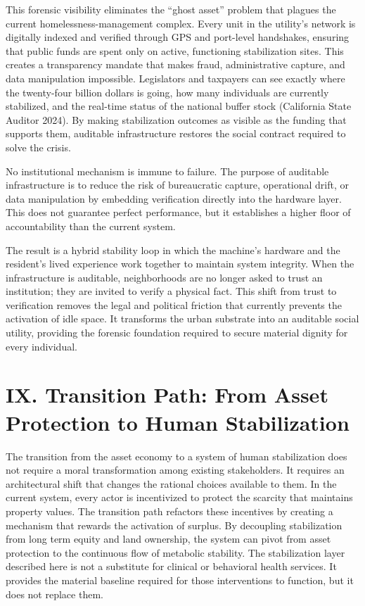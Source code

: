 \documentclass[
  12pt,
]{article}
\begin{document}
This forensic visibility eliminates the ``ghost asset'' problem that plagues the current homelessness-management complex. Every unit in the utility's network is digitally indexed and verified through GPS and port-level handshakes, ensuring that public funds are spent only on active, functioning stabilization sites. This creates a transparency mandate that makes fraud, administrative capture, and data manipulation impossible. Legislators and taxpayers can see exactly where the twenty-four billion dollars is going, how many individuals are currently stabilized, and the real-time status of the national buffer stock (California State Auditor 2024). By making stabilization outcomes as visible as the funding that supports them, auditable infrastructure restores the social contract required to solve the crisis.

No institutional mechanism is immune to failure. The purpose of auditable infrastructure is to reduce the risk of bureaucratic capture, operational drift, or data manipulation by embedding verification directly into the hardware layer. This does not guarantee perfect performance, but it establishes a higher floor of accountability than the current system.

The result is a hybrid stability loop in which the machine's hardware and the resident's lived experience work together to maintain system integrity. When the infrastructure is auditable, neighborhoods are no longer asked to trust an institution; they are invited to verify a physical fact. This shift from trust to verification removes the legal and political friction that currently prevents the activation of idle space. It transforms the urban substrate into an auditable social utility, providing the forensic foundation required to secure material dignity for every individual.

\hypertarget{ix.-transition-path-from-asset-protection-to-human-stabilization}{%
\section{IX. Transition Path: From Asset Protection to Human Stabilization}\label{ix.-transition-path-from-asset-protection-to-human-stabilization}}

The transition from the asset economy to a system of human stabilization does not require a moral transformation among existing stakeholders. It requires an architectural shift that changes the rational choices available to them. In the current system, every actor is incentivized to protect the scarcity that maintains property values. The transition path refactors these incentives by creating a mechanism that rewards the activation of surplus. By decoupling stabilization from long term equity and land ownership, the system can pivot from asset protection to the continuous flow of metabolic stability. The stabilization layer described here is not a substitute for clinical or behavioral health services. It provides the material baseline required for those interventions to function, but it does not replace them.
\end{document}
